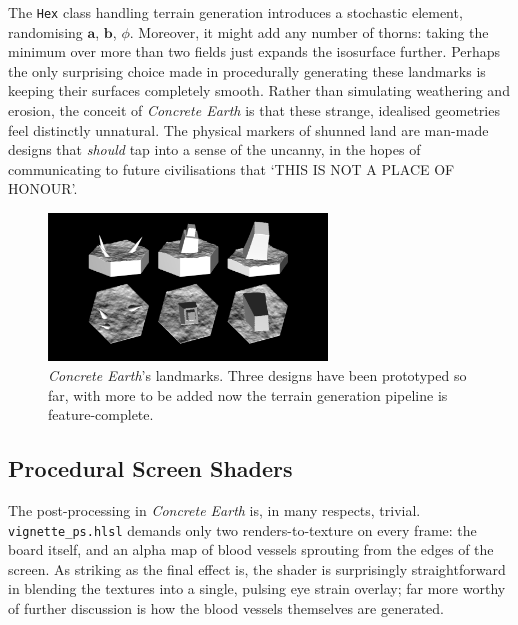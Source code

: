 \documentclass[a4paper, 11pt]{article}
\begin{document}
\begin{flushleft}
\vspace{5pt}\noindent
The \texttt{Hex} class handling terrain generation introduces a stochastic element, randomising $\mathbf{a}$, $\mathbf{b}$, $\phi$. Moreover, it might add any number of thorns: taking the minimum over more than two fields just expands the isosurface further. Perhaps the only surprising choice made in procedurally generating these landmarks is keeping their surfaces completely smooth. Rather than simulating weathering and erosion, the conceit of \textit{Concrete Earth} is that these strange, idealised geometries feel distinctly unnatural. The physical markers of shunned land are man-made designs that \textit{should} tap into a sense of the uncanny, in the hopes of communicating to future civilisations that `THIS IS NOT A PLACE OF HONOUR'.  %

\vspace{5pt}\noindent
\begin{figure}[h]
\centering
\includegraphics[width=0.66\textwidth]{Landmarks}
\caption{\textit{Concrete Earth}'s landmarks.  Three designs have been prototyped so far, with more to be added now the terrain generation pipeline is feature-complete.}
\label{Landmarks}
\end{figure}

\subsection{Procedural Screen Shaders}\label{Procedural Screen Shaders} %

The post-processing in \textit{Concrete Earth} is, in many respects, trivial. \texttt{vignette\_ps.hlsl} demands only two renders-to-texture on every frame: the board itself, and an alpha map of blood vessels sprouting from the edges of the screen. As striking as the final effect is, the shader is surprisingly straightforward in blending the textures into a single, pulsing eye strain overlay; far more worthy of further discussion is how the blood vessels themselves are generated.


\end{flushleft}
\end{document}
